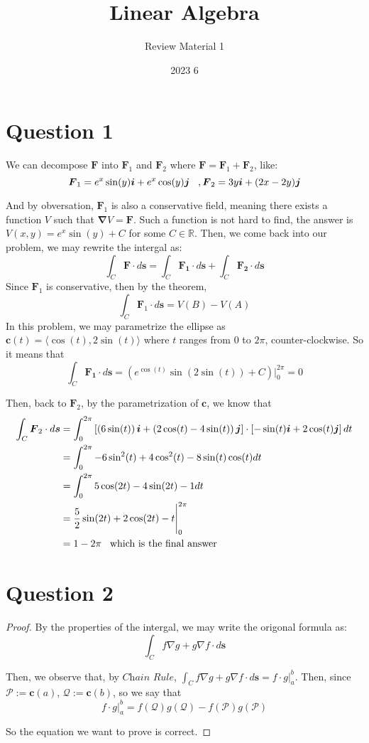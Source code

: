 \documentclass[12pt]{article}
\title{Linear Algebra}
\author{Review Material 1}
\date{2023 6}
\renewcommand{\vec}[1]{\boldsymbol{#1}}
\begin{document}
\doublespacing

\section*{Question 1}
We can decompose $\vec F$ into $\vec F_1$ and $\vec F_2$ where
$\vec F = \vec F_1 + \vec F_2$, like:
\[ \vec F_1 = e^x\sin(y) \vec i + e^x\cos(y) \vec j
\hspace*{0.3cm}, \vec F_2 = 3y \vec i + 
(2x-2y) \vec j\]

And by obversation, $\vec F_1$ is also a conservative field,
meaning there exists a function $V$ such that
$\vec{\nabla} V = \vec F$. Such a function is not hard to find,
the answer is $V(x,y) = e^x\sin(y) + C$ for some $C \in 
\mathbb{R}$. Then, we come back into our problem, we 
may rewrite the intergal as:
\[ \int_C \vec F \cdot d\vec s = \int_C \vec {F_1} \cdot
d \vec s + \int_C \vec {F_2} \cdot d \vec s\]
Since $\vec F_1$ is conservative, then by the theorem,
\[ \int_C \vec F_1 \cdot d \vec s = V(B) - V(A) \]
In this problem, we may parametrize the ellipse as
$\vec c(t) = \langle \cos(t) , 2\sin(t) \rangle$ where
$t$ ranges from $0$ to $2\pi$, counter-clockwise. So
it means that
\[ \int_C \vec{F_1} \cdot d \vec s = (e^{\displaystyle{\cos(t)} }\sin(2\sin(t)) + C)
\Bigg|^{2\pi}_{0} = 0\]

Then, back to $\vec F_2$, by the parametrization of
$\vec c$, we know that
\begin{align*}
\int_C \vec F_2 \cdot d \vec s &= \int_0^{2\pi} \left[ \left(6\sin(t)\right) \vec i + \left( 2\cos(t) - 4\sin(t) \right) \vec j \right] \cdot \left[ -\sin(t) \vec i + 2\cos(t) \vec j \right] dt \\
&= \int_0^{2\pi} -6\sin^2(t) + 4\cos^2(t) - 8\sin(t)\cos(t) dt \\
&= \int_0^{2\pi} 5\cos(2t) - 4\sin(2t) -1 dt \\
&= \frac{5}{2}\sin(2t)+2\cos(2t)-t \Bigg|^{2\pi}_{0}\\
&= 1 - 2\pi \hspace{0.3cm} \text{which is the final answer}
\end{align*}

\newpage
\section*{Question 2}
\begin{proof}
By the properties of the intergal, we may write the 
origonal formula as:
\[ \int_C f \nabla g + g \nabla f \cdot d \vec s \]

Then, we observe that, by $\textit{Chain Rule}$,
$\displaystyle{\int_C f\nabla g + g \nabla f \cdot d
\vec s = f\cdot g \Bigg|^b_a}$. Then, since 
$ \mathcal{P} := \vec c(a)$, $\mathcal{Q} := 
\vec c(b)$, so we say that
\[ f\cdot g \Bigg|^b_a = f(\mathcal{Q})g(\mathcal{Q}) - 
f(\mathcal{P}) g(\mathcal{P})\]

So the equation we want to prove is correct.

\end{proof}
\end{document}
